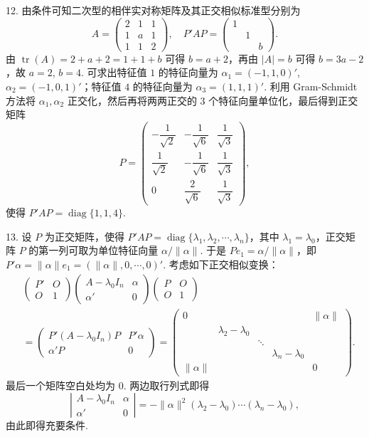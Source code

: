 \documentclass[UTF8,12pt,a4paper,fontset=fandol]{ctexart}
\begin{document}
12. 由条件可知二次型的相伴实对称矩阵及其正交相似标准型分别为
\[
A=\begin{pmatrix}
2&1&1\\
1&a&1\\
1&1&2
\end{pmatrix},\quad
P'AP=\begin{pmatrix}
1&&\\
&1&\\
&&b
\end{pmatrix}.
\]
由 $\operatorname{tr}(A)=2+a+2=1+1+b$ 可得 $b=a+2$，再由 $|A|=b$ 可得 $b=3a-2$，故 $a=2$, $b=4$. 可求出特征值 $1$ 的特征向量为 $\alpha_1=(-1,1,0)'$, $\alpha_2=(-1,0,1)'$；特征值 $4$ 的特征向量为 $\alpha_3=(1,1,1)'$. 利用 Gram-Schmidt 方法将 $\alpha_1,\alpha_2$ 正交化，然后再将两两正交的 $3$ 个特征向量单位化，最后得到正交矩阵
\[
P=\begin{pmatrix}
-\dfrac{1}{\sqrt{2}}&-\dfrac{1}{\sqrt{6}}&\dfrac{1}{\sqrt{3}}\\
\dfrac{1}{\sqrt{2}}&-\dfrac{1}{\sqrt{6}}&\dfrac{1}{\sqrt{3}}\\
0&\dfrac{2}{\sqrt{6}}&\dfrac{1}{\sqrt{3}}
\end{pmatrix},
\]
使得 $P'AP=\operatorname{diag}\{1,1,4\}$.

13. 设 $P$ 为正交矩阵，使得 $P'AP=\operatorname{diag}\{\lambda_1,\lambda_2,\cdots,\lambda_n\}$，其中 $\lambda_1=\lambda_0$，正交矩阵 $P$ 的第一列可取为单位特征向量 $\alpha/\|\alpha\|$. 于是 $Pe_1=\alpha/\|\alpha\|$，即 $P'\alpha=\|\alpha\|e_1=(\|\alpha\|,0,\cdots,0)'$. 考虑如下正交相似变换：
\[
\begin{aligned}
&\begin{pmatrix}
P'&O\\
O&1
\end{pmatrix}
\begin{pmatrix}
A-\lambda_0I_n&\alpha\\
\alpha'&0
\end{pmatrix}
\begin{pmatrix}
P&O\\
O&1
\end{pmatrix}\\
&=
\begin{pmatrix}
P'(A-\lambda_0I_n)P&P'\alpha\\
\alpha'P&0
\end{pmatrix}
=
\begin{pmatrix}
0&&&&\|\alpha\|\\
&\lambda_2-\lambda_0&&&\\
&&\ddots&&\\
&&&\lambda_n-\lambda_0&\\
\|\alpha\|&&&&0
\end{pmatrix}.
\end{aligned}
\]
最后一个矩阵空白处均为 $0$. 两边取行列式即得
\[
\left|\begin{matrix}
A-\lambda_0I_n&\alpha\\
\alpha'&0
\end{matrix}\right|
=-\|\alpha\|^2(\lambda_2-\lambda_0)\cdots(\lambda_n-\lambda_0),
\]
由此即得充要条件.
\end{document}
